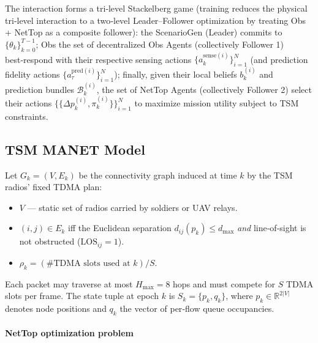 \documentclass[doc.tex]{subfiles}
\begin{document}
The interaction forms a tri‑level Stackelberg game (training reduces the physical tri‑level interaction to a two‑level Leader–Follower optimization by treating Obs + NetTop as a composite follower): the ScenarioGen (Leader) commits to $\{\theta_k\}_{k=0}^{T-1}$; Obs the set of decentralized Obs Agents (collectively Follower 1) best‑respond with their respective sensing actions $\{a_k^{\mathrm{sense}(i)}\}_{i=1}^N$ (and prediction fidelity actions $\{a_\tau^{\text{pred}(i)}\}_{i=1}^N$); finally, given their local beliefs $b_k^{(i)}$ and prediction bundles $\mathcal{B}_k^{(i)}$, the set of NetTop Agents (collectively Follower 2) select their actions $\{\{\Delta p_k^{(i)}, \pi_k^{(i)}\}\}_{i=1}^N$ to maximize mission utility subject to TSM constraints.

\subsection{TSM MANET Model}
\label{sec:tsm_model}

Let $G_k=(V,E_k)$ be the connectivity graph induced at time $k$ by the
TSM radios’ fixed TDMA plan:

\begin{itemize}
  \item $V$ — static set of radios carried by soldiers or UAV relays.
  \item $(i,j)\in E_k$ iff the Euclidean separation
        $d_{ij}(p_k)\le d_{\max}$ \emph{and} line‑of‑sight is not
        obstructed ($\mathrm{LOS}_{ij}=1$).
\item $\rho_k = (\text{\# TDMA slots used at }k)/S$.
\end{itemize}

Each packet may traverse at most $H_{\max}=8$ hops and must compete for
$S$ TDMA slots per frame. The state tuple at epoch $k$ is
$S_k=\{p_k,q_k\}$, where $p_k\in\mathbb{R}^{2|V|}$ denotes node
positions and $q_k$ the vector of per‑flow queue occupancies.


\paragraph{NetTop optimization problem}
\end{document}
